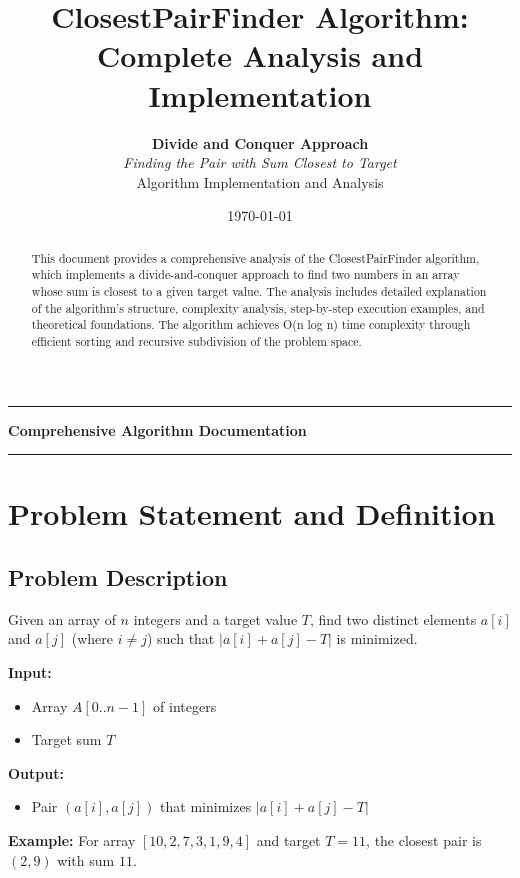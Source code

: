 \documentclass[12pt,a4paper]{article}
\title{\textbf{ClosestPairFinder Algorithm:\\Complete Analysis and Implementation}}
\author{
    \textbf{Divide and Conquer Approach}\\
    \textit{Finding the Pair with Sum Closest to Target}\\
    \vspace{0.5em}
    \small Algorithm Implementation and Analysis
}
\date{\today}
\begin{document}
\maketitle

\begin{center}
\rule{\textwidth}{2pt}
\vspace{0.5em}
\large \textbf{Comprehensive Algorithm Documentation}
\vspace{0.5em}
\rule{\textwidth}{1pt}
\end{center}

\vspace{2em}

\begin{abstract}
This document provides a comprehensive analysis of the ClosestPairFinder algorithm, which implements a divide-and-conquer approach to find two numbers in an array whose sum is closest to a given target value. The analysis includes detailed explanation of the algorithm's structure, complexity analysis, step-by-step execution examples, and theoretical foundations. The algorithm achieves O(n log n) time complexity through efficient sorting and recursive subdivision of the problem space.
\end{abstract}

\vspace{1em}
\tableofcontents
\newpage

\section{Problem Statement and Definition}

\subsection{Problem Description}
\begin{tcolorbox}[colback=blue!5!white,colframe=blue!50!black,title=\textbf{Closest Pair Sum Problem}]
Given an array of $n$ integers and a target value $T$, find two distinct elements $a[i]$ and $a[j]$ (where $i \neq j$) such that $|a[i] + a[j] - T|$ is minimized.

\textbf{Input:}
\begin{itemize}
    \item Array $A[0..n-1]$ of integers
    \item Target sum $T$
\end{itemize}

\textbf{Output:}
\begin{itemize}
    \item Pair $(a[i], a[j])$ that minimizes $|a[i] + a[j] - T|$
\end{itemize}

\textbf{Example:} For array $[10, 2, 7, 3, 1, 9, 4]$ and target $T = 11$, the closest pair is $(2, 9)$ with sum $11$.
\end{tcolorbox}
\end{document}
